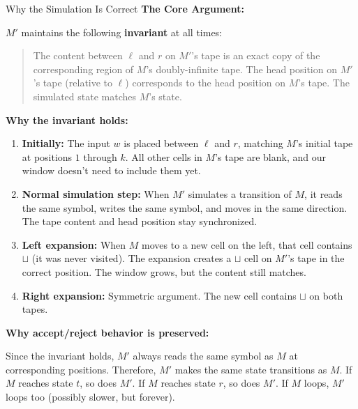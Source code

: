 \begin{conceptbox}{Why the Simulation Is Correct}
\textbf{The Core Argument:}

$M'$ maintains the following \textbf{invariant} at all times:

\begin{quote}
The content between $\ell$ and $r$ on $M'$'s tape is an exact copy of the
corresponding region of $M$'s doubly-infinite tape. The head position on
$M'$'s tape (relative to $\ell$) corresponds to the head position on $M$'s
tape. The simulated state matches $M$'s state.
\end{quote}

\textbf{Why the invariant holds:}
\begin{enumerate}[nosep]
\item \textbf{Initially:} The input $w$ is placed between $\ell$ and $r$,
  matching $M$'s initial tape at positions $1$ through $k$. All other cells
  in $M$'s tape are blank, and our window doesn't need to include them yet.
\item \textbf{Normal simulation step:} When $M'$ simulates a transition of
  $M$, it reads the same symbol, writes the same symbol, and moves in the
  same direction. The tape content and head position stay synchronized.
\item \textbf{Left expansion:} When $M$ moves to a new cell on the left, that
  cell contains $\sqcup$ (it was never visited). The expansion creates a
  $\sqcup$ cell on $M'$'s tape in the correct position. The window grows,
  but the content still matches.
\item \textbf{Right expansion:} Symmetric argument. The new cell contains
  $\sqcup$ on both tapes.
\end{enumerate}

\textbf{Why accept/reject behavior is preserved:}

Since the invariant holds, $M'$ always reads the same symbol as $M$ at
corresponding positions. Therefore, $M'$ makes the same state transitions as
$M$. If $M$ reaches state $t$, so does $M'$. If $M$ reaches state $r$, so
does $M'$. If $M$ loops, $M'$ loops too (possibly slower, but forever).

\end{conceptbox}



